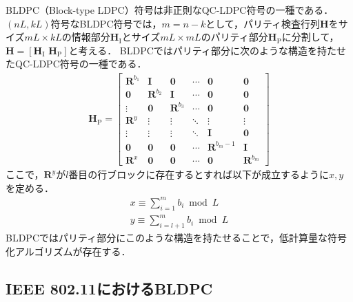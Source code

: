 \documentclass[twocolumn, a4paper]{ieicejsp}
\begin{document}
BLDPC（Block-type LDPC）符号は非正則なQC-LDPC符号の一種である．
$(nL,kL)$符号なBLDPC符号では，$m=n-k$として，パリティ検査行列$\mathbf{H}$をサイズ$mL \times kL$の情報部分$\mathbf{H}_\mathrm{I}$とサイズ$mL \times mL$のパリティ部分$\mathbf{H}_\mathrm{P}$に分割して，$\mathbf{H} = [\mathbf{H}_\mathrm{I} \,\, \mathbf{H}_\mathrm{P}]$と考える．
BLDPCではパリティ部分に次のような構造を持たせたQC-LDPC符号の一種である．
\begin{align}
  \mathbf{H}_{\mathrm{P}} = \begin{bmatrix}
    \mathbf{R}^{b_1} & \mathbf{I} & \mathbf{0} & \cdots & \mathbf{0} & \mathbf{0} \\
    \mathbf{0} & \mathbf{R}^{b_2} & \mathbf{I} & \cdots & \mathbf{0} & \mathbf{0} \\
    \vdots & \mathbf{0} & \mathbf{R}^{b_3} & \cdots & \mathbf{0} & \mathbf{0} \\
    \mathbf{R}^y & \vdots & \vdots & \ddots & \vdots & \vdots \\
    \vdots & \vdots & \vdots & \ddots & \mathbf{I} & \mathbf{0} \\
    \mathbf{0} & \mathbf{0} & \mathbf{0} & \cdots & \mathbf{R}^{b_m-1} & \mathbf{I} \\
    \mathbf{R}^x & \mathbf{0} & \mathbf{0} & \cdots & \mathbf{0} & \mathbf{R}^{b_m}
  \end{bmatrix}
\end{align}
ここで，$\mathbf{R}^y$が$l$番目の行ブロックに存在するとすれば以下が成立するように$x,y$を定める．
\begin{align}
  x \equiv \sum_{i=1}^{m} b_i \,\,\, \mathrm{mod} \,\,\, L \\
  y \equiv \sum_{i=l+1}^{m} b_i \,\,\, \mathrm{mod} \,\,\, L 
\end{align}
BLDPCではパリティ部分にこのような構造を持たせることで，低計算量な符号化アルゴリズムが存在する\cite{QCLDPC}．


\subsection{IEEE 802.11におけるBLDPC}
\end{document}
